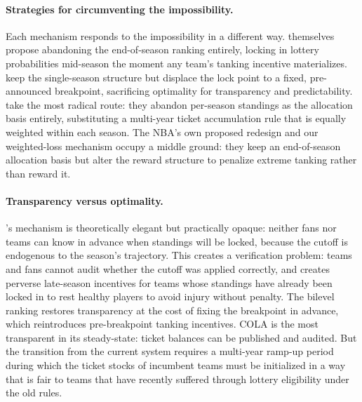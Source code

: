 \documentclass{article}
\begin{document}
\paragraph{Strategies for circumventing the impossibility.}
Each mechanism responds to the \citet{banchio2020} impossibility in a
different way.
\citet{banchio2020} themselves propose abandoning the end-of-season ranking
entirely, locking in lottery probabilities mid-season the moment any team's
tanking incentive materializes.
\citet{kazachkov2020} keep the single-season structure but displace the lock
point to a fixed, pre-announced breakpoint, sacrificing optimality for
transparency and predictability.
\citet{highley2026} take the most radical route: they abandon per-season
standings as the allocation basis entirely, substituting a multi-year ticket
accumulation rule that is equally weighted within each season.
The NBA's own proposed redesign and our weighted-loss mechanism occupy a middle
ground: they keep an end-of-season allocation basis but alter the reward
structure to penalize extreme tanking rather than reward it.

\paragraph{Transparency versus optimality.}
\citet{banchio2020}'s mechanism is theoretically elegant but practically
opaque: neither fans nor teams can know in advance when standings will be
locked, because the cutoff is endogenous to the season's trajectory.
This creates a verification problem: teams and fans cannot audit whether the
cutoff was applied correctly, and creates perverse late-season incentives
for teams whose standings have already been locked in to rest healthy players
to avoid injury without penalty.
The bilevel ranking \citep{kazachkov2020} restores transparency at the cost
of fixing the breakpoint in advance, which reintroduces pre-breakpoint
tanking incentives.
COLA \citep{highley2026} is the most transparent in its steady-state: ticket
balances can be published and audited.
But the transition from the current system requires a multi-year ramp-up
period during which the ticket stocks of incumbent teams must be initialized
in a way that is fair to teams that have recently suffered through lottery
eligibility under the old rules.
\end{document}
